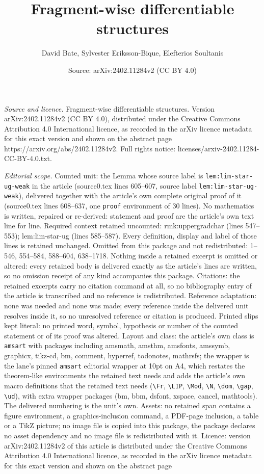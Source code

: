 \documentclass[10pt,a4paper]{amsart}
\title[Fragment-wise differentiable structures]{Fragment-wise differentiable structures}
\author{David Bate, Sylvester Eriksson-Bique, Elefterios Soultanis}
\date{Source: arXiv:2402.11284v2 (CC BY 4.0)}
\begin{document}
\maketitle

\noindent\emph{Source and licence.} Fragment-wise differentiable structures. Version arXiv:2402.11284v2 (CC BY 4.0), distributed under the Creative Commons Attribution 4.0 International licence, as recorded in the arXiv licence metadata for this exact version and shown on the abstract page https://arxiv.org/abs/2402.11284v2. Full rights notice: licenses/arxiv-2402.11284-CC-BY-4.0.txt.\par\smallskip

\noindent\textit{Editorial scope.} Counted unit: the Lemma whose source label is \texttt{lem:lim-star-ug-weak} in the article (source0.tex lines 605--607, source label \texttt{lem:lim-star-ug-weak}), delivered together with the article's own complete original proof of it (source0.tex lines 608--637, one \texttt{proof} environment of 30 lines). No mathematics is written, repaired or re-derived: statement and proof are the article's own text line for line. Required context retained uncounted: rmk:uppergradchar (lines 547--553); lem:lim-star-ug (lines 585--587). Every definition, display and label of those lines is retained unchanged. Omitted from this package and not redistributed: 1--546, 554--584, 588--604, 638--1718. Nothing inside a retained excerpt is omitted or altered: every retained body is delivered exactly as the article's lines are written, so no omission receipt of any kind accompanies this package. Citations: the retained excerpts carry no citation command at all, so no bibliography entry of the article is transcribed and no reference is redistributed. Reference adaptation: none was needed and none was made; every reference inside the delivered unit resolves inside it, so no unresolved reference or citation is produced. Printed slips kept literal: no printed word, symbol, hypothesis or number of the counted statement or of its proof was altered. Layout and class: the article's own class is \texttt{amsart} with packages including amsmath, amsthm, amsfonts, amssymb, graphicx, tikz-cd, bm, comment, hyperref, todonotes, mathrsfs; the wrapper is the lane's pinned \texttt{amsart} editorial wrapper at 10pt on A4, which restates the theorem-like environments the retained text needs and adds the article's own macro definitions that the retained text needs (\texttt{\textbackslash Fr}, \texttt{\textbackslash LIP}, \texttt{\textbackslash Mod}, \texttt{\textbackslash N}, \texttt{\textbackslash dom}, \texttt{\textbackslash gap}, \texttt{\textbackslash ud}), with extra wrapper packages (bm, bbm, dsfont, xspace, cancel, mathtools). The delivered numbering is the unit's own. Assets: no retained span contains a figure environment, a graphics-inclusion command, a PDF-page inclusion, a table or a TikZ picture; no image file is copied into this package, the package declares no asset dependency and no image file is redistributed with it. Licence: version arXiv:2402.11284v2 of this article is distributed under the Creative Commons Attribution 4.0 International licence, as recorded in the arXiv licence metadata for this exact version and shown on the abstract page 
\end{document}
